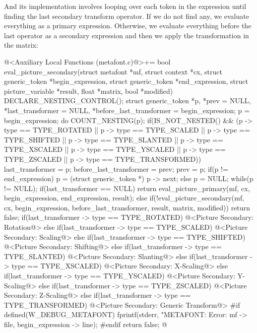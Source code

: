 {{{{{And its implementation involves looping over each token in the
expression until finding the last secondary transform operator. If we
do not find any, we evaluate everything as a primary
expression. Otherwise, we evaluate everything before the last operator
as a secondary expression and then we apply the transformation in the
matrix:

\iniciocodigo
@<Auxiliary Local Functions (metafont.c)@>+=
bool eval_picture_secondary(struct metafont *mf, struct context *cx,
                            struct generic_token *begin_expression,
                            struct generic_token *end_expression,
                            struct picture_variable *result,
                            float *matrix, bool *modified){
  DECLARE_NESTING_CONTROL();
  struct generic_token *p, *prev = NULL, *last_transformer = NULL,
                       *before_last_transformer = begin_expression;
  p = begin_expression;
  do{
    COUNT_NESTING(p);
    if(IS_NOT_NESTED() && (p -> type == TYPE_ROTATED ||
       p -> type == TYPE_SCALED || p -> type == TYPE_SHIFTED ||
       p -> type == TYPE_SLANTED || p -> type == TYPE_XSCALED ||
       p -> type == TYPE_YSCALED || p -> type == TYPE_ZSCALED ||
       p -> type == TYPE_TRANSFORMED)){
      last_transformer = p;
      before_last_transformer = prev;
    }
    prev = p;
    if(p != end_expression)
      p = (struct generic_token *) p -> next;
    else
      p = NULL;
  }while(p != NULL);
  if(last_transformer == NULL)
    return eval_picture_primary(mf, cx, begin_expression, end_expression, result);
  else{
    if(!eval_picture_secondary(mf, cx, begin_expression,
                               before_last_transformer, result, matrix, modified))
      return false;
    if(last_transformer -> type == TYPE_ROTATED){
      @<Picture Secondary: Rotation@>
    }
    else if(last_transformer -> type == TYPE_SCALED){
      @<Picture Secondary: Scaling@>
    }
    else if(last_transformer -> type == TYPE_SHIFTED){
      @<Picture Secondary: Shifting@>
    }
    else if(last_transformer -> type == TYPE_SLANTED){
      @<Picture Secondary: Slanting@>
    }
    else if(last_transformer -> type == TYPE_XSCALED){
      @<Picture Secondary: X-Scaling@>
    }
    else if(last_transformer -> type == TYPE_YSCALED){
      @<Picture Secondary: Y-Scaling@>
    }
    else if(last_transformer -> type == TYPE_ZSCALED){
      @<Picture Secondary: Z-Scaling@>
    }
    else if(last_transformer -> type == TYPE_TRANSFORMED){
      @<Picture Secondary: Generic Transform@>
    }
#if defined(W_DEBUG_METAFONT)
    fprintf(stderr, "METAFONT: Error: %
            mf -> file, begin_expression -> line);
#endif
    return false;
  }
}
@
\fimcodigo

}}}}}
